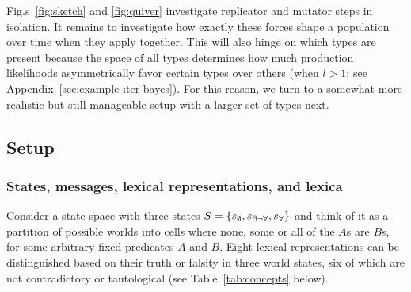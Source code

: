 \documentclass[a4paper, 11pt]{article}
\theoremstyle{Satz}
\newcommand{\set}[1]{\left\{#1\right\}}
\newcommand{\States}{\ensuremath{S}\xspace}		%
\newcommand{\state}{\ensuremath{s}\xspace}		%
\newcommand{\mystate}[1]{\ensuremath{\state_{\text{#1}}}\xspace} %
\newcommand{\ssome}{\mystate{\ensuremath{\exists\neg\forall}}}
\newcommand{\sall}{\mystate{\ensuremath{\forall}}}
\newcommand{\snone}{\mystate{\ensuremath{\emptyset}}}
\begin{document}
Fig.s~\ref{fig:sketch} and \ref{fig:quiver} investigate replicator and mutator steps in
isolation. It remains to investigate how exactly these forces shape a population over time when
they apply together. This will also hinge on which types are present because the space of all
types determines how much production likelihoods asymmetrically favor certain types over others
(when $l>1$; see Appendix~\ref{sec:example-iter-bayes}). For this reason, we turn to a somewhat
more realistic but still manageable setup with a larger set of types next.



\subsection{Setup}
\label{sec:setup:-stat-conc}


\subsubsection{States, messages, lexical representations, and lexica} 
\label{sec:stat-mess-conc}

Consider a state space with three states $\States = \set{\snone, \ssome, \sall}$ and think of
it as a partition of possible worlds into cells where none, some or all of the $A$s are $B$s,
for some arbitrary fixed predicates $A$ and $B$. Eight lexical representations can be
distinguished based on their truth or falsity in three world states, six of which are not
contradictory or tautological (see Table~\ref{tab:concepts} below).
\end{document}
